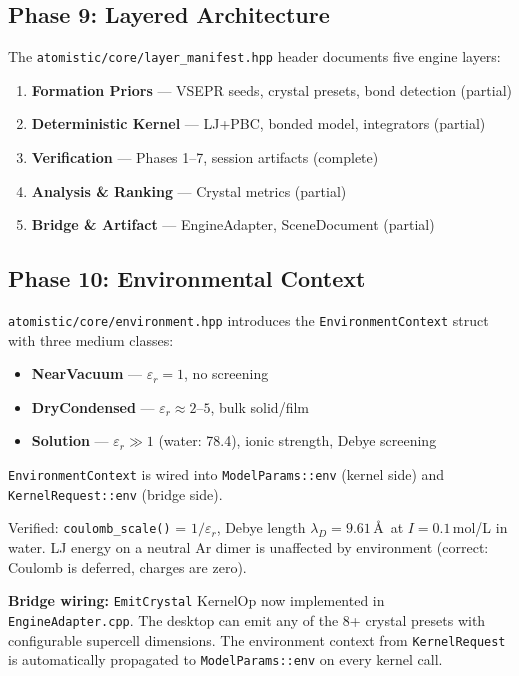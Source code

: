 \documentclass[11pt]{article}
\begin{document}
\subsection{Phase 9: Layered Architecture}

The \texttt{atomistic/core/layer\_manifest.hpp} header documents five
engine layers:

\begin{enumerate}
\item \textbf{Formation Priors} --- VSEPR seeds, crystal presets, bond detection (partial)
\item \textbf{Deterministic Kernel} --- LJ+PBC, bonded model, integrators (partial)
\item \textbf{Verification} --- Phases 1--7, session artifacts (complete)
\item \textbf{Analysis \& Ranking} --- Crystal metrics (partial)
\item \textbf{Bridge \& Artifact} --- EngineAdapter, SceneDocument (partial)
\end{enumerate}

\subsection{Phase 10: Environmental Context}

\texttt{atomistic/core/environment.hpp} introduces the
\texttt{EnvironmentContext} struct with three medium classes:

\begin{itemize}
\item \textbf{NearVacuum} --- $\varepsilon_r = 1$, no screening
\item \textbf{DryCondensed} --- $\varepsilon_r \approx 2$--$5$, bulk solid/film
\item \textbf{Solution} --- $\varepsilon_r \gg 1$ (water: 78.4),
      ionic strength, Debye screening
\end{itemize}

\texttt{EnvironmentContext} is wired into \texttt{ModelParams::env}
(kernel side) and \texttt{KernelRequest::env} (bridge side).

Verified: \texttt{coulomb\_scale()} = $1/\varepsilon_r$,
Debye length $\lambda_D = 9.61$\,\AA\ at $I = 0.1$\,mol/L in water.
LJ energy on a neutral Ar dimer is unaffected by environment (correct:
Coulomb is deferred, charges are zero).

\textbf{Bridge wiring:} \texttt{EmitCrystal} KernelOp now implemented
in \texttt{EngineAdapter.cpp}.  The desktop can emit any of the 8+
crystal presets with configurable supercell dimensions.  The environment
context from \texttt{KernelRequest} is automatically propagated to
\texttt{ModelParams::env} on every kernel call.
\end{document}
